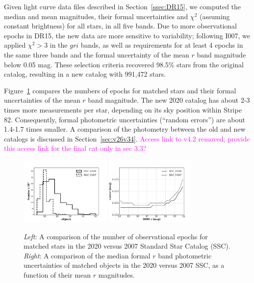 \documentclass[fleqn,usenatbib]{mnras}
\newcommand{\pO}{\hbox{I007}}
\newcommand{\KT}[1]{\textcolor{magenta}{#1}} %
\begin{document}
Given light curve data files described in Section~\ref{ssec:DR15}, we computed the median 
and mean magnitudes, their formal uncertainties and $\chi^2$ (assuming constant brightness)
for all stars, in all five bands. Due to more observational epochs in DR15, the new data are more 
sensitive to variability; following \pO, we applied $\chi^2>3$ in the $gri$ bands, as well as  
requirements for at least 4 epochs in the same three bands and the formal uncertainty of the 
mean $r$ band magnitude below 0.05 mag. These selection criteria recovered 98.5\% stars from
the original catalog, resulting in a new catalog with 991,472 stars. 

Figure~\ref{fig:rerr_nvso} compares the numbers of epochs for matched stars and their formal
uncertainties of the mean $r$ band magnitude. The new 2020 catalog has about 2-3 times more 
measurements per star, depending on its sky position within Stripe 82. Consequently,  formal 
photometric uncertainties (``random errors'') are about 1.4-1.7 times smaller. A comparison of the photometry between the old and new catalogs is discussed in Section~\ref{sec:v26v34}. 
\KT{Access link to v4.2 removed; provide this access link for the final cat only in sec 3.3?}%



\begin{figure}
\centering
\includegraphics[width=0.4\textwidth, keepaspectratio]{figures/nepoch_compOvsN_BW.png}
\includegraphics[width=0.4\textwidth, keepaspectratio]{figures/rerr_compOvsN_BW.png}
\caption{{\it Left}: A comparison of the number of observational epochs for matched stars in the 2020 versus 2007 Standard Star Catalog (SSC). {\it Right}: A comparison of the median formal $r$ band photometric uncertainties of matched objects in the 2020 versus 2007 SSC, as a function of their mean $r$ magnitudes.
\label{fig:rerr_nvso}}
\end{figure}
\end{document}
